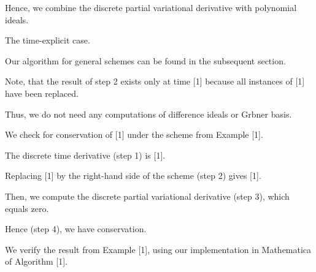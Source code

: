 \documentclass{amsart}
\begin{document}
\noindent {\color{green} ********************}

\noindent 

\noindent {\color{green} ********************}



\noindent {\color{green} ********************}

\noindent  Hence, we combine the discrete partial variational derivative with polynomial ideals.

\noindent   The time-explicit case.

\noindent  

\noindent {\color{green} ********************}



\noindent {\color{green} ********************}

\noindent  Our algorithm for general schemes can be found in the subsequent section.

\noindent   Note, that the result of step 2 exists only at time [1] because all instances of [1] have been replaced.

\noindent   Thus, we do not need any computations of difference ideals or Grbner basis.

\noindent   We check for conservation of [1] under the scheme from Example [1].

\noindent   The discrete time derivative (step 1) is [1].

\noindent   Replacing [1] by the right-hand side of the scheme (step 2) gives [1].

\noindent   Then, we compute the discrete partial variational derivative (step 3), which equals zero.

\noindent   Hence (step 4), we have conservation.

\noindent   We verify the result from Example [1], using our implementation in Mathematica of Algorithm [1].
\end{document}
